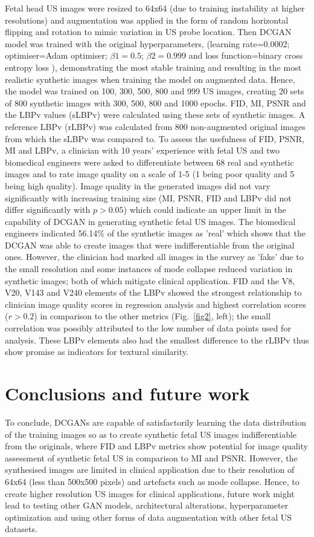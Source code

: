\documentclass[runningheads]{llncs}
\begin{document}
Fetal head US images were resized to 64x64 (due to training instability at higher resolutions) and augmentation was applied in the form of random horizontal flipping and rotation to mimic variation in US probe location.
Then DCGAN model was trained with the original hyperparameters, (learning rate=0.0002; optimiser=Adam optimiser; $\beta1=0.5$; $\beta2= 0.999$ and loss function=binary cross entropy loss  \cite{radford2016unsupervised}), demonstrating the most stable training and resulting in the most realistic synthetic images when training the model on augmented data.
Hence, the model was trained on 100, 300, 500, 800 and 999 US images, creating 20 sets of 800 synthetic images with 300, 500, 800 and 1000 epochs.
FID, MI, PSNR and the LBPv values (sLBPv) were calculated using these sets of synthetic images.
A reference LBPv (rLBPv) was calculated from 800 non-augmented original images from which the sLBPv was compared to.
To assess the usefulness of FID, PSNR, MI and LBPv, a clinician with 10 years' experience with fetal US and two biomedical engineers were asked to differentiate between 68 real and synthetic images and to rate image quality on a scale of 1-5 (1 being poor quality and 5 being high quality).
Image quality in the generated images did not vary significantly with increasing training size (MI, PSNR, FID and LBPv did not differ significantly with $p>0.05$) which could indicate an upper limit in the capability of DCGAN in generating synthetic fetal US images.
The biomedical engineers indicated 56.14\% of the synthetic images as 'real' which shows that the DCGAN was able to create images that were indifferentiable from the original ones.
However, the clinician had marked all images in the survey as 'fake' due to the small resolution and some instances of mode collapse reduced variation in synthetic images; both of which mitigate clinical application.
FID and the V8, V20, V143 and V240 elements of the LBPv showed the strongest relationship to clinician image quality scores in regression analysis and highest correlation scores ($r>0.2$) in comparison to the other metrics (Fig.~\ref{fig2}, left); the small correlation was possibly attributed to the low number of data points used for analysis. These LBPv elements also had the smallest difference to the rLBPv thus show promise as indicators for textural similarity.


\section{Conclusions and future work}
To conclude, DCGANs are capable of satisfactorily learning the data distribution of the training images so as to create synthetic fetal US images indifferentiable from the originals, where FID and LBPv metrics show potential for image quality assessment of synthetic fetal US in comparison to MI and PSNR.
However, the synthesised images are limited in clinical application due to their resolution of 64x64 (less than 500x500 pixels) and artefacts such as mode collapse.
Hence, to create higher resolution US images for clinical applications, future work might lead to testing other GAN models, architectural alterations, hyperparameter optimization and using other forms of data augmentation with other fetal US datasets.
\end{document}
